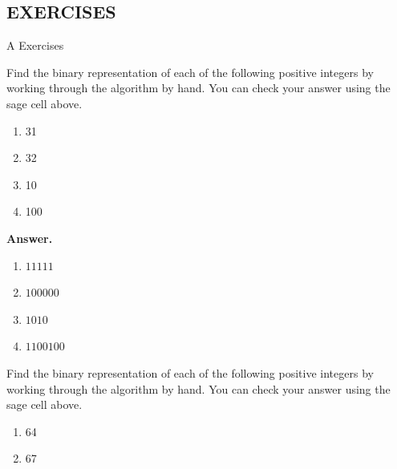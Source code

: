 \documentclass[10pt,]{book}
\theoremstyle{plain}
\theoremstyle{definition}
\theoremstyle{definition}
\theoremstyle{definition}
\theoremstyle{definition}
\begin{document}
\subsection[EXERCISES]{EXERCISES}\label{exercises-1-4}
\hypertarget{exercisegroup-7}{}\typeout{************************************************}
\typeout{************************************************}
A Exercises%
\begin{exercisegroup}
\item[1.]\hypertarget{exercise-24}{}Find the binary representation of each of the following positive integers by working through the algorithm by hand.  You can check your answer using the sage cell above. %
\par
\leavevmode%
\begin{multicols}{2}
\begin{enumerate}[label=\alph*]
\item\hypertarget{li-182}{} 31%
\item\hypertarget{li-183}{} 32%
\item\hypertarget{li-184}{}10%
\item\hypertarget{li-185}{}100 %
\end{enumerate}
\end{multicols}
%
\par\smallskip
\par\smallskip
\noindent\textbf{Answer.}\hypertarget{answer-13}{}\quad
\leavevmode%
\begin{multicols}{2}
\begin{enumerate}[label=\alph*]
\item\hypertarget{li-186}{} \(11111\)%
\item\hypertarget{li-187}{} \(100000\)%
\item\hypertarget{li-188}{} \(1010\)%
\item\hypertarget{li-189}{} \(1100100\)%
\end{enumerate}
\end{multicols}
%
\item[2.]\hypertarget{exercise-25}{}Find the binary representation of each of the following positive integers by working through the algorithm by hand.  You can check your answer using the sage cell above. %
\par
\leavevmode%
\begin{multicols}{2}
\begin{enumerate}[label=\alph*]
\item\hypertarget{li-190}{} 64%
\item\hypertarget{li-191}{} 67%

\end{enumerate}
\end{multicols}
\end{exercisegroup}
\end{document}
